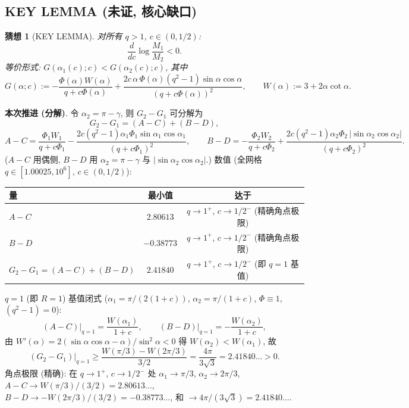 \documentclass[UTF8]{ctexart}
\newtheorem{conjecture}[theorem]{猜想}
\begin{document}
\subsection{KEY LEMMA (未证, 核心缺口)}

\begin{conjecture}[KEY LEMMA]
对所有 $q>1$, $c\in(0,1/2)$:
\begin{equation}
	\frac{d}{dc}\log\frac{M_1}{M_2} < 0.
\end{equation}
等价形式: $G(\alpha_1(c);c) < G(\alpha_2(c);c)$, 其中
\begin{equation}
	G(\alpha;c) := -\frac{\Phi(\alpha)W(\alpha)}{q+c\Phi(\alpha)}
		+ \frac{2c\,\alpha\,\Phi(\alpha)(q^2-1)\sin\alpha\cos\alpha}{(q+c\Phi(\alpha))^2},
	\qquad W(\alpha) := 3 + 2\alpha\cot\alpha .
\end{equation}
\end{conjecture}

\textbf{本次推进 (分解)}. 令 $\alpha_2 = \pi-\gamma$, 则 $G_2-G_1$ 可分解为
\begin{equation}
	G_2 - G_1 = (A-C) + (B-D),
\end{equation}
\begin{equation}
	A-C = \frac{\Phi_1 W_1}{q+c\Phi_1} - \frac{2c(q^2-1)\alpha_1\Phi_1\sin\alpha_1\cos\alpha_1}{(q+c\Phi_1)^2},
	\qquad
	B-D = -\frac{\Phi_2 W_2}{q+c\Phi_2}
		+ \frac{2c(q^2-1)\alpha_2\Phi_2\,|\sin\alpha_2\cos\alpha_2|}{(q+c\Phi_2)^2}.
\end{equation}
($A-C$ 用偶侧, $B-D$ 用 $\alpha_2=\pi-\gamma$ 与 $|\sin\alpha_2\cos\alpha_2|$.)
数值 (全网格 $q\in[1.00025, 10^6]$, $c\in(0,1/2)$):
\begin{center}
\begin{tabular}{lcc}
\toprule
量 & 最小值 & 达于 \\
\midrule
$A-C$ & $2.80613$ & $q\to1^+$, $c\to1/2^-$ (精确角点极限) \\
$B-D$ & $-0.38773$ & $q\to1^+$, $c\to1/2^-$ (精确角点极限) \\
$G_2-G_1 = (A-C)+(B-D)$ & $2.41840$ & $q\to1^+$, $c\to1/2^-$ (即 $q=1$ 基值) \\
\bottomrule
\end{tabular}
\end{center}
$q=1$ (即 $R=1$) 基值闭式 ($\alpha_1=\pi/(2(1+c))$,
$\alpha_2=\pi/(1+c)$, $\Phi\equiv1$, $(q^2-1)=0$):
\begin{equation}
	(A-C)\big|_{q=1} = \frac{W(\alpha_1)}{1+c},
	\qquad
	(B-D)\big|_{q=1} = -\frac{W(\alpha_2)}{1+c},
\end{equation}
由 $W'(\alpha) = 2(\sin\alpha\cos\alpha - \alpha)/\sin^2\alpha < 0$
得 $W(\alpha_2) < W(\alpha_1)$, 故
\begin{equation}
	(G_2-G_1)\big|_{q=1} \ge \frac{W(\pi/3) - W(2\pi/3)}{3/2}
		= \frac{4\pi}{3\sqrt3} = 2.41840\ldots > 0 .
\end{equation}
角点极限 (精确): 在 $q\to1^+$, $c\to1/2^-$ 处 $\alpha_1\to\pi/3$, $\alpha_2\to2\pi/3$,
$A-C \to W(\pi/3)/(3/2) = 2.80613\ldots$, $B-D \to -W(2\pi/3)/(3/2) = -0.38773\ldots$,
和 $\to 4\pi/(3\sqrt3) = 2.41840\ldots$.
\end{document}
